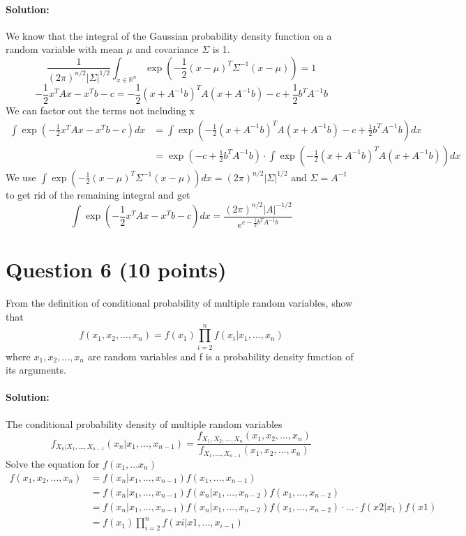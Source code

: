 \documentclass[
	10pt, %
]{../fphw}
\begin{document}
	\paragraph{Solution:} We know that the integral of the Gaussian probability density function on a random variable with mean $\mu$ and covariance $\Sigma$ is 1.
	\begin{equation*}
		\frac{1}{(2\pi)^{n/2}|\Sigma|^{1/2}}\int_{x\in\mathbb{R}^n}\exp(-\frac{1}{2} (x-\mu)^T\Sigma^{-1}(x-\mu)) = 1
	\end{equation*}
	\begin{equation*}
		-\frac{1}{2}x^TAx - x^Tb - c = -\frac{1}{2}(x+A^{-1}b)^TA(x+A^{-1}b) - c + \frac{1}{2}b^TA^{-1}b
	\end{equation*}
	We can factor out the terms not including x
	\begin{align*}
		\int\exp(-\frac{1}{2}x^TAx-x^Tb-c)dx &= \int\exp(-\frac{1}{2}(x+A^{-1}b)^TA(x+A^{-1}b) - c + \frac{1}{2}b^TA^{-1}b) dx\\
		&= \exp(- c + \frac{1}{2}b^TA^{-1}b) \cdot \int\exp(-\frac{1}{2}(x+A^{-1}b)^TA(x+A^{-1}b))dx
	\end{align*}
	We use $\int\exp(-\frac{1}{2} (x-\mu)^T\Sigma^{-1}(x-\mu))dx = (2\pi)^{n/2}|\Sigma|^{1/2}$ and $\Sigma = A^{-1}$ to get rid of the remaining integral and get
	\begin{equation*}
		\int\exp(-\frac{1}{2}x^TAx-x^Tb-c)dx = \frac{(2\pi)^{n/2}|A|^{-1/2}}{e^{c-\frac{1}{2}b^TA^{-1}b}}
	\end{equation*}

	\section*{Question 6 (10 points)}
	\begin{problem}
		From the definition of conditional probability of multiple random variables, show that
		\begin{equation*}
			f(x_1,x_2,...,x_n) = f(x_1)\prod_{i=2}^{n}f(x_i|x_1,...,x_n)
		\end{equation*}
		where $x_1,x_2,...,x_n$ are random variables and f is a probability density function of its arguments.
	\end{problem}
	\paragraph{Solution:} The conditional probability density of multiple random variables
	\begin{equation*}
		f_{X_n|X_1,...,X_{n-1}}(x_n|x_1,...,x_{n-1}) = \frac{f_{X_1,X_2,...,X_n}(x_1,x_2,...,x_n)}{f_{X_1,...,X_{n-1}}(x_1,x_2,...,x_n)}
	\end{equation*}
	Solve the equation for $f(x_1,...x_n)$
	\begin{align*}
		f(x_1,x_2,...,x_n) &= f(x_n|x_1,...,x_{n-1})f(x_1,...,x_{n-1})\\
		&= f(x_n|x_1,...,x_{n-1})f(x_n|x_1,...,x_{n-2})f(x_1,...,x_{n-2})\\
		&= f(x_n|x_1,...,x_{n-1})f(x_n|x_1,...,x_{n-2})f(x_1,...,x_{n-2})\cdot ...\cdot f(x2|x_1)f(x1)\\
		&= f(x_1)\prod_{i=2}^{n}f(xi|x1,...,x_{i-1})
	\end{align*}
	
\end{document}
